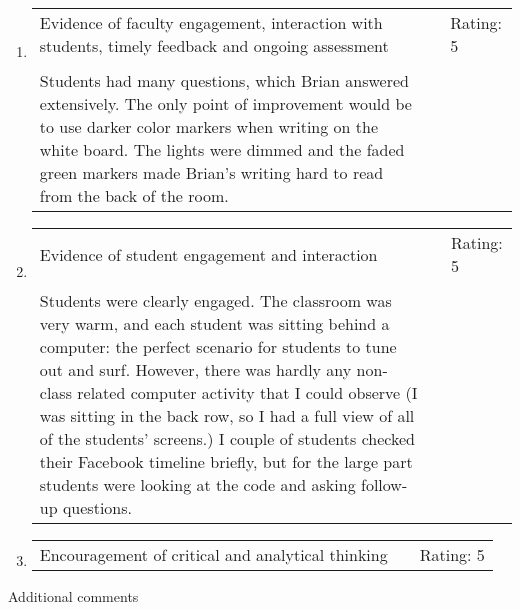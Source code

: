 \documentclass[11pt,dvipsnames]{article}
\begin{document}
\begin{enumerate}[label= {\bf  \arabic*:}]
\begin{tabular}[t]{p{}  p{3cm} p{3cm} }
\end{tabular}
\item 	\begin{tabular}[t]{p{}  p{3cm} p{3cm} }
Evidence of faculty engagement, interaction with students, timely feedback and ongoing assessment & & Rating: 5\\
& &\\
Students had many questions, which Brian answered extensively. The only point of improvement would be to use darker color markers when writing on the white board. The lights were dimmed and the faded  green markers made Brian's writing hard to read from the back of the room.&&\
\end{tabular}
\item 	\begin{tabular}[t]{p{}  p{3cm} p{3cm} }
	Evidence of student engagement and interaction & & Rating: 5\\
	& &\\
	Students were clearly engaged. The classroom was very warm, and each student was sitting behind a computer: the perfect scenario for students to tune out and surf. However, there was hardly any non-class related computer activity that I could observe (I was sitting in the back row, so I had a full view of all of the students' screens.) I couple of students checked their Facebook timeline  briefly, but for the large part students were looking at the code and asking follow-up questions.& & \\
\end{tabular}
\item 	\begin{tabular}[t]{p{}  p{3cm} p{3cm} }
	Encouragement of critical and analytical thinking & & Rating: 5\\
\end{tabular}
\end{enumerate}
\vskip 1cm
{\large Additional comments}
\end{document}
